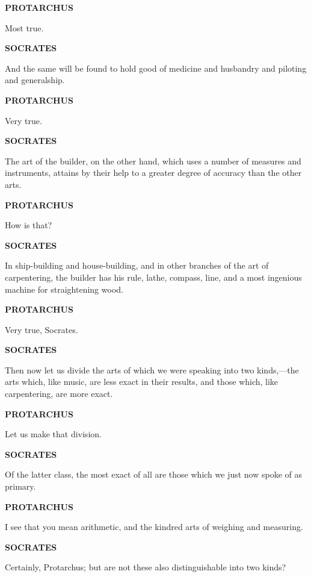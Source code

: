 \documentclass[11pt,letter]{article}
\begin{document}
\par \textbf{PROTARCHUS}
\par   Most true.

\par \textbf{SOCRATES}
\par   And the same will be found to hold good of medicine and husbandry and piloting and generalship.

\par \textbf{PROTARCHUS}
\par   Very true.

\par \textbf{SOCRATES}
\par   The art of the builder, on the other hand, which uses a number of measures and instruments, attains by their help to a greater degree of accuracy than the other arts.

\par \textbf{PROTARCHUS}
\par   How is that?

\par \textbf{SOCRATES}
\par   In ship-building and house-building, and in other branches of the art of carpentering, the builder has his rule, lathe, compass, line, and a most ingenious machine for straightening wood.

\par \textbf{PROTARCHUS}
\par   Very true, Socrates.

\par \textbf{SOCRATES}
\par   Then now let us divide the arts of which we were speaking into two kinds,—the arts which, like music, are less exact in their results, and those which, like carpentering, are more exact.

\par \textbf{PROTARCHUS}
\par   Let us make that division.

\par \textbf{SOCRATES}
\par   Of the latter class, the most exact of all are those which we just now spoke of as primary.

\par \textbf{PROTARCHUS}
\par   I see that you mean arithmetic, and the kindred arts of weighing and measuring.

\par \textbf{SOCRATES}
\par   Certainly, Protarchus; but are not these also distinguishable into two kinds?
\end{document}
